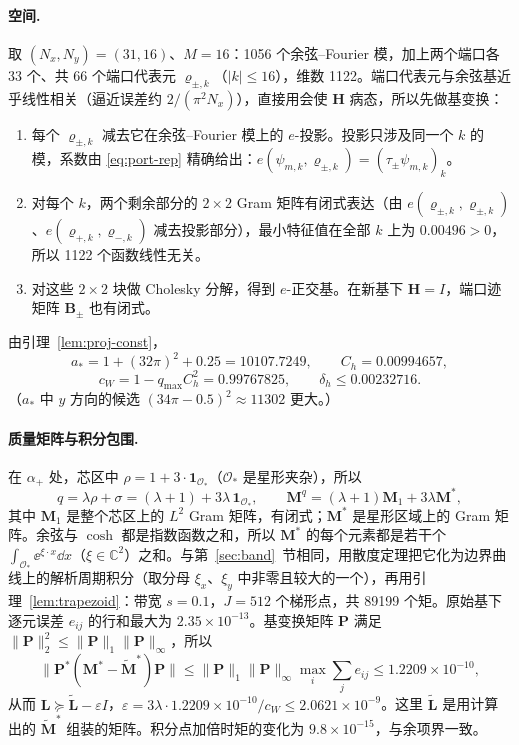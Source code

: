 \documentclass[11pt,a4paper,fontset=fandol]{ctexart}
\begin{document}
\paragraph{空间.} 取 $(N_x,N_y)=(31,16)$、$M=16$：1056 个余弦--Fourier 模，加上两个端口各 33 个、共 66 个端口代表元 $\varrho_{\pm,k}$（$|k|\le16$），维数 1122。端口代表元与余弦基近乎线性相关（逼近误差约 $2/(\pi^2N_x)$），直接用会使 $\bm H$ 病态，所以先做基变换：
\begin{enumerate}
\item 每个 $\varrho_{\pm,k}$ 减去它在余弦--Fourier 模上的 $e$-投影。投影只涉及同一个 $k$ 的模，系数由 \eqref{eq:port-rep} 精确给出：$e(\psi_{m,k},\varrho_{\pm,k})=(\tau_\pm\psi_{m,k})_k$。
\item 对每个 $k$，两个剩余部分的 $2\times2$ Gram 矩阵有闭式表达（由 $e(\varrho_{\pm,k},\varrho_{\pm,k})$、$e(\varrho_{+,k},\varrho_{-,k})$ 减去投影部分），最小特征值在全部 $k$ 上为 $0.00496>0$，所以 1122 个函数线性无关。
\item 对这些 $2\times2$ 块做 Cholesky 分解，得到 $e$-正交基。在新基下 $\bm H=I$，端口迹矩阵 $\bm B_\pm$ 也有闭式。
\end{enumerate}
由引理~\ref{lem:proj-const}，
\[
a_*=1+(32\pi)^2+0.25=10107.7249,\qquad C_h=0.00994657,\]\[c_W=1-q_{\max}C_h^2=0.99767825,\qquad\delta_h\le0.00232716 .
\]
（$a_*$ 中 $y$ 方向的候选 $(34\pi-0.5)^2\approx11302$ 更大。）

\paragraph{质量矩阵与积分包围.} 在 $\alpha_+$ 处，芯区中 $\rho=1+3\cdot\mathbf 1_{\mathcal O_*}$（$\mathcal O_*$ 是星形夹杂），所以
\[
q=\lambda\rho+\sigma=(\lambda+1)+3\lambda\,\mathbf 1_{\mathcal O_*},\qquad\bm M^q=(\lambda+1)\bm M_1+3\lambda\bm M^{*},
\]
其中 $\bm M_1$ 是整个芯区上的 $L^2$ Gram 矩阵，有闭式；$\bm M^*$ 是星形区域上的 Gram 矩阵。余弦与 $\cosh$ 都是指数函数之和，所以 $\bm M^*$ 的每个元素都是若干个 $\int_{\mathcal O_*}\ee^{\xi\cdot x}\dd x$（$\xi\in\mathbb C^2$）之和。与第~\ref{sec:band}~节相同，用散度定理把它化为边界曲线上的解析周期积分（取分母 $\xi_x$、$\xi_y$ 中非零且较大的一个），再用引理~\ref{lem:trapezoid}：带宽 $s=0.1$，$J=512$ 个梯形点，共 89199 个矩。原始基下逐元误差 $e_{ij}$ 的行和最大为 $2.35\times10^{-13}$。基变换矩阵 $\bm P$ 满足 $\|\bm P\|_2^2\le\|\bm P\|_1\|\bm P\|_\infty$，所以
\[
\|\bm P^*(\bm M^*-\tilde{\bm M}^*)\bm P\|\le\|\bm P\|_1\|\bm P\|_\infty\max_i\sum_je_{ij}\le1.2209\times10^{-10},
\]
从而 $\bm L\succeq\tilde{\bm L}-\varepsilon I$，$\varepsilon=3\lambda\cdot1.2209\times10^{-10}/c_W\le2.0621\times10^{-9}$。这里 $\tilde{\bm L}$ 是用计算出的 $\tilde{\bm M}^*$ 组装的矩阵。积分点加倍时矩的变化为 $9.8\times10^{-15}$，与余项界一致。
\end{document}
